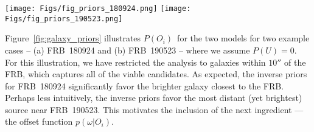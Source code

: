 \documentclass[twocolumn,linenumbers]{aastex63}
\newcommand{\frblocal}{99.9\%}  %
\newcommand{\mhalflight}{\phi} %
\newcommand{\mpchance}{P^c}
\newcommand{\pchance}{$\mpchance$}
\newcommand{\mipchance}{\mpchance_i}
\newcommand{\mpoffset}{p(\omega|O_i)}  %
\newcommand{\poffset}{$\mpoffset$}
\newcommand{\mPO}{P(O)}  %
\newcommand{\PO}{$\mPO$}
\newcommand{\mPOi}{P(O_i)}  %
\newcommand{\POi}{$\mPOi$}
\newcommand{\mPU}{P(U)}  %
\newcommand{\PU}{$\mPU$}
\newcommand{\uguess}{0}  %
\begin{document}





\begin{figure*}[!ht]
\centering
    \texttt{[image: Figs/fig\_priors\_180924.png]}
    \texttt{[image: Figs/fig\_priors\_190523.png]}
    \caption{
    Illustration of the two approaches to candidate priors
    \PO\ assumed in this manuscript:
    identical and inverse.  The former assumes an identical
    prior for every galaxy with $\theta_i < 10 \mhalflight$
    or within the \frblocal\ localization error of the FRB.
    The latter adopts the inverse of the
    estimated chance probability \pchance\ 
    of these galaxies which is equivalent to asserting
    the prior is proportional to the integrated probability
    that the other sources are all chance coincidences.
    }
	\label{fig:galaxy_priors}
\end{figure*}


Figure~\ref{fig:galaxy_priors} illustrates 
\POi\ for the two models for two example cases --
(a) FRB~180924 and (b) FRB~190523 --  where
we assume $\mPU = \uguess$.
For this illustration, we have restricted the analysis to galaxies
within $10''$ of the FRB, which captures all of the viable
candidates.  As expected, the inverse priors for
FRB~180924 significantly favor the brighter galaxy closest
to the FRB.  Perhaps less intuitively, the 
inverse priors favor the most distant 
(yet brightest) source near
FRB~190523. This motivates the inclusion of the next ingredient --- the offset function \poffset.
\end{document}
